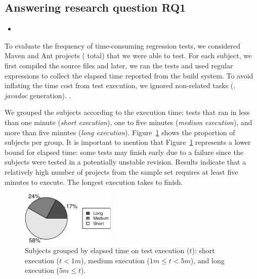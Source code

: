\subsection{Answering research question RQ1}
\label{sec:rqone}

\begin{itemize}
    \item \RQA
\end{itemize}

To evaluate the frequency of time-consuming regression tests, we
considered  Maven and  Ant projects ( total)
that we were able to test. For each subject, we first compiled the
source files and later, we ran the tests and used regular expressions
to collect the elapsed time reported from the build system. To avoid
inflating the time cost from test execution, we ignored non-related
tasks (\eg, \emph{javadoc} generation). .

We grouped the subjects according to the execution time: tests that
ran in less than one minute (\emph{short execution}), one to five
minutes (\emph{medium execution}), and more than five minutes
(\emph{long execution}). Figure~\ref{fig:piechart-time} shows the
proportion of subjects per group. It is important to mention that
Figure~\ref{fig:piechart-time} represents a lower bound for elapsed
time: some tests may finish early due to a failure since the subjects
were tested in a potentially unstable revision. Results indicate
that a relatively high number of projects from the sample set requires
at least five minutes to execute. The longest execution takes 
to finish.

\begin{figure}[h!]
    \centering
    \includegraphics[width=0.4\textwidth]{results/rq1/plots/piechart.pdf}
    \caption{\label{fig:piechart-time} Subjects grouped by elapsed
    time on test execution ($t$): short execution ($t < 1m$), medium 
    execution ($1m \leq t < 5m$), and long execution ($5m \leq t$).}
\end{figure}

